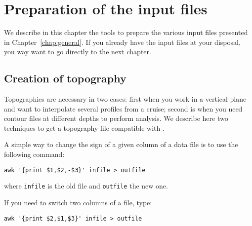 \chapter{Preparation of the input files\label{Preprocessing}}

We describe in this chapter the tools to prepare the various input files presented in Chapter~\ref{chap:general}. If you already have the input files at your disposal, you way want to go directly to the next chapter.

\minitoc

\section{Creation of topography\label{sec:howtotopo}}

Topographies are necessary in two cases: first when you work in a vertical plane and want to interpolate several profiles from a cruise; second is when you need contour files at different depths to perform analysis. We describe here two techniques to get a topography file compatible with \diva.


\begin{center}
\end{center}

\btips
A simple way to change the sign of a given column of a data file is to use the following command:
\begin{verbatim}
awk '{print $1,$2,-$3}' infile > outfile
\end{verbatim}
where \texttt{infile} is the old file and \texttt{outfile} the new one.

If you need to switch two columns of a file, type:
\begin{verbatim}
awk '{print $2,$1,$3}' infile > outfile
\end{verbatim}
\etips



